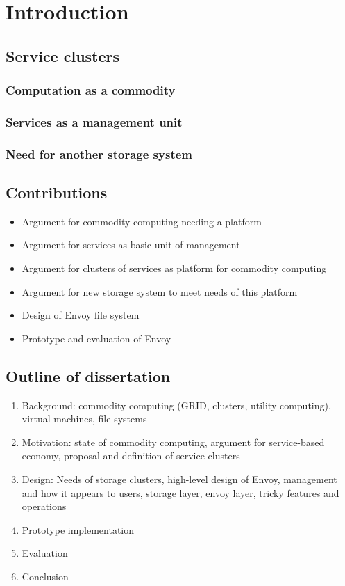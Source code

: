 \chapter{Introduction}

\section{Service clusters}

\subsection{Computation as a commodity}
\subsection{Services as a management unit}
\subsection{Need for another storage system}

\section{Contributions}
\begin{itemize}
\item Argument for commodity computing needing a platform
\item Argument for services as basic unit of management
\item Argument for clusters of services as platform for commodity computing
\item Argument for new storage system to meet needs of this platform
\item Design of Envoy file system
\item Prototype and evaluation of Envoy
\end{itemize}

\section{Outline of dissertation}
\begin{enumerate}
\item Background: commodity computing (GRID, clusters, utility computing), virtual machines, file systems
\item Motivation: state of commodity computing, argument for service-based economy, proposal and definition of service clusters
\item Design: Needs of storage clusters, high-level design of Envoy, management and how it appears to users, storage layer, envoy layer, tricky features and operations
\item Prototype implementation
\item Evaluation
\item Conclusion
\end{enumerate}